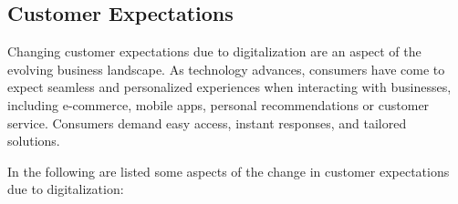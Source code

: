 \documentclass[a4]{scrartcl}
\begin{document}
\subsection{Customer Expectations} \label{subsec:CustomerExpectations}

Changing customer expectations due to digitalization are an aspect of the evolving business landscape.
As technology advances, consumers have come to expect seamless and personalized experiences when interacting with businesses, including e-commerce, mobile apps, personal recommendations or customer service. Consumers demand easy access, instant responses, and tailored solutions.~\cite{CustomerExpectations, socialmedia, masterthesis,digitalmatrix, leadingdigital}

In the following are listed some aspects of the change in customer expectations due to digitalization:
\end{document}
